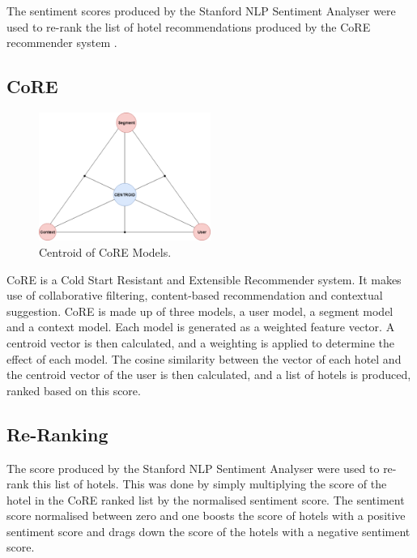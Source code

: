 The sentiment scores produced by the Stanford NLP Sentiment Analyser \cite{stanfordSentiment2013} were used to re-rank the list of hotel recommendations produced by the CoRE recommender system \cite{core2019}.

\subsection*{CoRE}

\begin{figure}[h!]
\centering
\includegraphics[width=0.5\textwidth]{design_and_methodology/centroid.png}
\caption{\label{fig:centroid} Centroid of CoRE Models.}
\end{figure}

CoRE \cite{core2019} is a Cold Start Resistant and Extensible Recommender system. It makes use of collaborative filtering, content-based recommendation and contextual suggestion. CoRE is made up of three models, a user model, a segment model and a context model. Each model is generated as a weighted feature vector. A centroid vector is then calculated, and a weighting is applied to determine the effect of each model. The cosine similarity between the vector of each hotel and the centroid vector of the user is then calculated, and a list of hotels is produced, ranked based on this score.

\subsection*{Re-Ranking}

The score produced by the Stanford NLP Sentiment Analyser were used to re-rank this list of hotels. This was done by simply multiplying the score of the hotel in the CoRE ranked list by the normalised sentiment score. The sentiment score normalised between zero and one boosts the score of hotels with a positive sentiment score and drags down the score of the hotels with a negative sentiment score.



